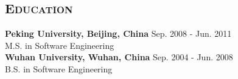 \begin{resume}


\vspace*{-20pt}
\section{\textsc{Education}}

\textbf{Peking University, Beijing, China} \hfill Sep. 2008 - Jun. 2011 \\
M.S. in Software Engineering\\
\newline
\textbf{Wuhan University, Wuhan, China} \hfill Sep. 2004 - Jun. 2008 \\
B.S. in Software Engineering\\



\end{resume}

